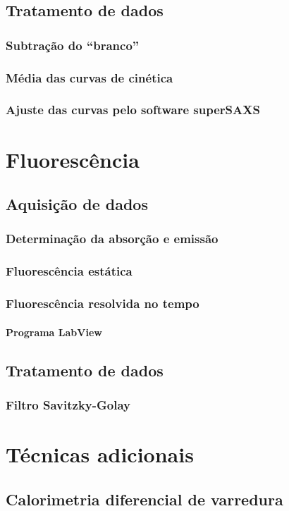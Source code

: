 \documentclass[a4paper, 10pt]{book}
\begin{document}
		\section{Tratamento de dados}
			\subsection{Subtração do ``branco''}
			\subsection{Média das curvas de cinética}
			\subsection{Ajuste das curvas pelo software superSAXS}
	\chapter{Fluorescência}
		\section{Aquisição de dados}
			\subsection{Determinação da absorção e emissão}
			\subsection{Fluorescência estática}
			\subsection{Fluorescência resolvida no tempo}
				\subsubsection{Programa LabView}
		\section{Tratamento de dados}
			\subsection{Filtro Savitzky-Golay}
	\chapter{Técnicas adicionais}
		\section{Calorimetria diferencial de varredura}
\end{document}
